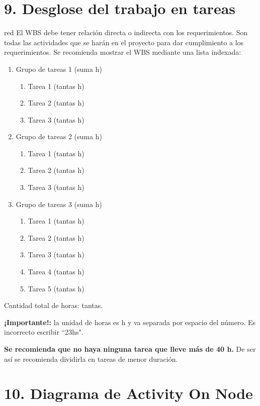 \documentclass[
11pt, %
]{charter}
\begin{document}
\section{9. Desglose del trabajo en tareas}
\label{sec:wbs}

\begin{consigna}{red}
El WBS debe tener relación directa o indirecta con los requerimientos.  Son todas las actividades que se harán en el proyecto para dar cumplimiento a los requerimientos. Se recomienda mostrar el WBS mediante una lista indexada:

\begin{enumerate}
\item Grupo de tareas 1 (suma h)
	\begin{enumerate}
	\item Tarea 1 (tantas h)
	\item Tarea 2 (tantas h)
	\item Tarea 3 (tantas h)
	\end{enumerate}
\item Grupo de tareas 2 (suma h)
	\begin{enumerate}
	\item Tarea 1 (tantas h)
	\item Tarea 2 (tantas h)
	\item Tarea 3 (tantas h)
	\end{enumerate}
\item Grupo de tareas 3 (suma h)
	\begin{enumerate}
	\item Tarea 1 (tantas h)
	\item Tarea 2 (tantas h)
	\item Tarea 3 (tantas h)
	\item Tarea 4 (tantas h)
	\item Tarea 5 (tantas h)
	\end{enumerate}
\end{enumerate}

Cantidad total de horas: tantas.

\textbf{¡Importante!:} la unidad de horas es h y va separada por espacio del número. Es incorrecto escribir ``23hs".

\textbf{Se recomienda que no haya ninguna tarea que lleve más de 40 h.} De ser así se recomienda dividirla en tareas de menor duración.

\end{consigna}

\section{10. Diagrama de Activity On Node}
\label{sec:AoN}
\end{document}
